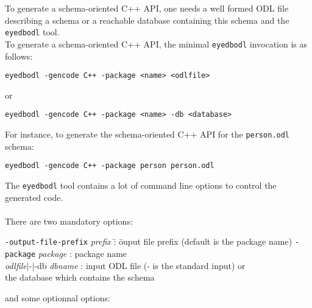 To generate a schema-oriented C++ API, one needs a well formed ODL
file describing a schema or a reachable database containing this schema
and the \texttt{eyedbodl} tool.
\\
To generate a schema-oriented C++ API, the minimal \texttt{eyedbodl} invocation
is as follows:
\begin{verbatim}
eyedbodl -gencode C++ -package <name> <odlfile>
\end{verbatim}
or
\begin{verbatim}
eyedbodl -gencode C++ -package <name> -db <database>
\end{verbatim}
For instance, to generate the schema-oriented C++ API for the \texttt{person.odl}
schema:
\begin{verbatim}
eyedbodl -gencode C++ -package person person.odl
\end{verbatim}
The \texttt{eyedbodl} tool contains a lot of command line options to
control the generated code.
\\
\\
There are two mandatory options:
\begin{tabbing}
\texttt{-output-file-prefix} \emph{prefix} \= : \= ouput file prefix (default is the package name)\kill
\texttt{-package} \emph{package}     \> : \> package name\\
\emph{odlfile}$|$-$|$-db \emph{dbname}    \> : \> input ODL file (- is the standard input) or\\
\>                          \> the database which contains the schema \\
\end{tabbing}
and some optionnal options:
